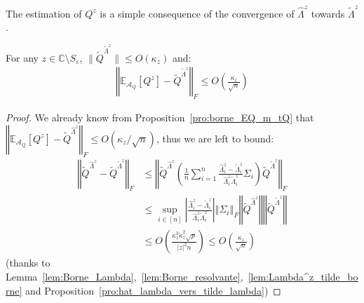 \documentclass[a4papaer, titlepage]{book}
\begin{document}
The estimation of $Q^z$ is a simple consequence of the convergence of $\hat\Lambda^z$ towards $\tilde \Lambda^z$.
\begin{corollary}\label{cor:deux_eq_deterministes_proches}
  For any $z \in \mathbb C \setminus S_\varepsilon$, $\|\tilde Q^{\tilde \Lambda^z}\| \leq O(\kappa_z)$ and:
  \begin{align*}
    \left\Vert \mathbb{E}_{\mathcal A_Q} \left[Q^z\right] - \tilde Q^{\tilde \Lambda^z}\right\Vert_F \leq O \left(\frac{\kappa_z}{\sqrt{n}}\right)
  \end{align*}
\end{corollary}
\begin{proof}
  We already know from Proposition~\ref{pro:borne_EQ_m_tQ} that $\left\Vert \mathbb{E}_{\mathcal A_Q} \left[Q^z\right] - \tilde Q^{\hat \Lambda^z} \right\Vert_F \leq O(\kappa_z/\sqrt n)$, thus we are left to bound:
  \begin{align*}
    \left\Vert \tilde Q^{\hat \Lambda^z} - \tilde Q^{\tilde \Lambda^z} \right\Vert_F
    & \leq \left\Vert \tilde Q^{\hat \Lambda^z} \left(\frac{1}{n} \sum_{i=1}^n \frac{\hat \Lambda_i^z - \tilde \Lambda_i^z}{\hat \Lambda_i^z\tilde \Lambda_i^z} \Sigma_i\right) \tilde Q^{\tilde \Lambda^z} \right\Vert_F\\
    & \leq  \sup_{i\in [n]} \left\vert \frac{\hat \Lambda_i^z - \tilde \Lambda_i^z}{\hat \Lambda_i^z\tilde \Lambda_i^z}\right\vert\left\Vert  \Sigma_i \right\Vert_F \left\Vert  \tilde Q^{\hat \Lambda^z}\right\Vert\left\Vert  \tilde Q^{\tilde \Lambda^z}\right\Vert\\
    &\leq O \left(\frac{\kappa_z^3 \check \kappa_z^2 \sqrt{p}}{|z|^2n}\right) \leq O \left(\frac{\kappa_z}{\sqrt n}\right)
  \end{align*}
  (thanks to Lemma~\ref{lem:Borne_Lambda},~\ref{lem:Borne_resolvante},~\ref{lem:Lambda^z_tilde_borne} and Proposition~\ref{pro:hat_lambda_vers_tilde_lambda})

\end{proof}
\end{document}
